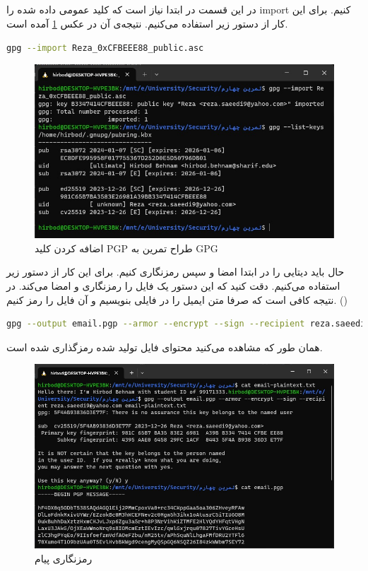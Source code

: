 \documentclass[]{article}
\begin{document}
\subsection{}
در این قسمت در ابتدا نیاز است که کلید عمومی داده شده را
import
کنیم. برای این کار از دستور زیر استفاده می‌کنیم. نتیجه‌ی آن در عکس
\ref{fig:gpg:import}
آمده است.
\begin{latin}
\begin{lstlisting}[language=sh]
gpg --import Reza_0xCFBEEE88_public.asc
\end{lstlisting}
\end{latin}
\begin{figure}[H]
    \centering
    \includegraphics[scale=0.5]{pics/gpg-import.jpg}
    \caption{اضافه کردن کلید PGP طراح تمرین به GPG}
    \label{fig:gpg:import}
\end{figure}
حال باید دیتایی را در ابتدا امضا و سپس رمزنگاری کنیم. برای این کار از دستور زیر استفاده می‌کنیم.
دقت کنید که این دستور یک فایل را رمزنگاری و امضا می‌کند. در نتیجه کافی است که صرفا متن ایمیل را در فایلی
بنویسیم و آن فایل را رمز کنیم.
()
\begin{latin}
\begin{lstlisting}[language=sh]
    gpg --output email.pgp --armor --encrypt --sign --recipient reza.saeedi9@yahoo.com email-plaintext.txt
\end{lstlisting}
\end{latin}
همان طور که مشاهده می‌کنید محتوای فایل تولید شده رمزگذاری شده است.
\begin{figure}[H]
    \centering
    \includegraphics[scale=0.5]{pics/gpg-encrypt.jpg}
    \caption{رمزنگاری پیام}
    \label{fig:gpg:encrypt}
\end{figure}
\end{document}

